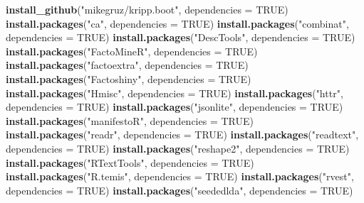 \documentclass[
]{book}
\newenvironment{Shaded}{\begin{snugshade}}{\end{snugshade}}
\newcommand{\AttributeTok}[1]{\textcolor[rgb]{0.13,0.29,0.53}{#1}}
\newcommand{\ConstantTok}[1]{\textcolor[rgb]{0.56,0.35,0.01}{#1}}
\newcommand{\FunctionTok}[1]{\textcolor[rgb]{0.13,0.29,0.53}{\textbf{#1}}}
\newcommand{\NormalTok}[1]{#1}
\newcommand{\StringTok}[1]{\textcolor[rgb]{0.31,0.60,0.02}{#1}}
\begin{document}
\begin{Shaded}
\begin{Highlighting}[]
\FunctionTok{install\_github}\NormalTok{(}\StringTok{"mikegruz/kripp.boot"}\NormalTok{, }\AttributeTok{dependencies =} \ConstantTok{TRUE}\NormalTok{)}
\FunctionTok{install.packages}\NormalTok{(}\StringTok{"ca"}\NormalTok{, }\AttributeTok{dependencies =} \ConstantTok{TRUE}\NormalTok{)}
\FunctionTok{install.packages}\NormalTok{(}\StringTok{"combinat"}\NormalTok{, }\AttributeTok{dependencies =} \ConstantTok{TRUE}\NormalTok{)}
\FunctionTok{install.packages}\NormalTok{(}\StringTok{"DescTools"}\NormalTok{, }\AttributeTok{dependencies =} \ConstantTok{TRUE}\NormalTok{)}
\FunctionTok{install.packages}\NormalTok{(}\StringTok{"FactoMineR"}\NormalTok{, }\AttributeTok{dependencies =} \ConstantTok{TRUE}\NormalTok{)}
\FunctionTok{install.packages}\NormalTok{(}\StringTok{"factoextra"}\NormalTok{, }\AttributeTok{dependencies =} \ConstantTok{TRUE}\NormalTok{)}
\FunctionTok{install.packages}\NormalTok{(}\StringTok{"Factoshiny"}\NormalTok{, }\AttributeTok{dependencies =} \ConstantTok{TRUE}\NormalTok{)}
\FunctionTok{install.packages}\NormalTok{(}\StringTok{"Hmisc"}\NormalTok{, }\AttributeTok{dependencies =} \ConstantTok{TRUE}\NormalTok{)}
\FunctionTok{install.packages}\NormalTok{(}\StringTok{"httr"}\NormalTok{, }\AttributeTok{dependencies =} \ConstantTok{TRUE}\NormalTok{)}
\FunctionTok{install.packages}\NormalTok{(}\StringTok{"jsonlite"}\NormalTok{, }\AttributeTok{dependencies =} \ConstantTok{TRUE}\NormalTok{)}
\FunctionTok{install.packages}\NormalTok{(}\StringTok{"manifestoR"}\NormalTok{, }\AttributeTok{dependencies =} \ConstantTok{TRUE}\NormalTok{)}
\FunctionTok{install.packages}\NormalTok{(}\StringTok{"readr"}\NormalTok{, }\AttributeTok{dependencies =} \ConstantTok{TRUE}\NormalTok{)}
\FunctionTok{install.packages}\NormalTok{(}\StringTok{"readtext"}\NormalTok{, }\AttributeTok{dependencies =} \ConstantTok{TRUE}\NormalTok{)}
\FunctionTok{install.packages}\NormalTok{(}\StringTok{"reshape2"}\NormalTok{, }\AttributeTok{dependencies =} \ConstantTok{TRUE}\NormalTok{)}
\FunctionTok{install.packages}\NormalTok{(}\StringTok{"RTextTools"}\NormalTok{, }\AttributeTok{dependencies =} \ConstantTok{TRUE}\NormalTok{)}
\FunctionTok{install.packages}\NormalTok{(}\StringTok{"R.temis"}\NormalTok{, }\AttributeTok{dependencies =} \ConstantTok{TRUE}\NormalTok{)}
\FunctionTok{install.packages}\NormalTok{(}\StringTok{"rvest"}\NormalTok{, }\AttributeTok{dependencies =} \ConstantTok{TRUE}\NormalTok{)}
\FunctionTok{install.packages}\NormalTok{(}\StringTok{"seededlda"}\NormalTok{, }\AttributeTok{dependencies =} \ConstantTok{TRUE}\NormalTok{)}

\end{Highlighting}
\end{Shaded}
\end{document}
